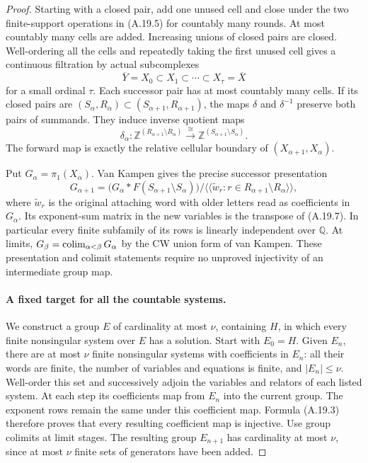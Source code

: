 \begin{proof}
Starting with a closed pair, add one unused cell and close
under the two finite-support operations in (A.19.5) for
countably many rounds. At most countably many cells are
added. Increasing unions of closed pairs are closed.
Well-ordering all the cells and repeatedly taking the first
unused cell gives a continuous filtration by actual
subcomplexes
\[
 \overline Y=X_0\subset X_1\subset\cdots\subset
 X_\tau=\overline X
 \tag{A.19.6}
\]
for a small ordinal $\tau$. Each successor pair has at most
countably many cells. If its closed pairs are
$(S_\alpha,R_\alpha)\subset(S_{\alpha+1},R_{\alpha+1})$,
the maps $\delta$ and $\delta^{-1}$ preserve both pairs of
summands. They induce inverse quotient maps
\[
 \delta_\alpha:
 \mathbb Z^{(R_{\alpha+1}\setminus R_\alpha)}
       \xrightarrow{\ \cong\ }
 \mathbb Z^{(S_{\alpha+1}\setminus S_\alpha)}.
 \tag{A.19.7}
\]
The forward map is exactly the relative cellular boundary of
$(X_{\alpha+1},X_\alpha)$.

Put $G_\alpha=\pi_1(X_\alpha)$. Van Kampen gives the precise
successor presentation
\[
 G_{\alpha+1}=
 \bigl(G_\alpha*F(S_{\alpha+1}\setminus S_\alpha)\bigr)
 \big/
 \langle\!\langle \widetilde w_r:
                    r\in R_{\alpha+1}\setminus R_\alpha
                    \rangle\!\rangle,
 \tag{A.19.8}
\]
where $\widetilde w_r$ is the original attaching word with
older letters read as coefficients in $G_\alpha$. Its
exponent-sum matrix in the new variables is the transpose
of (A.19.7). In particular every finite subfamily of its
rows is linearly independent over $\mathbb Q$. At limits,
$G_\beta=\mathop{\rm colim}_{\alpha<\beta}G_\alpha$ by
the CW union form of van Kampen. These presentation and
colimit statements require no unproved injectivity of an
intermediate group map.

\paragraph{A fixed target for all the countable systems.}
We construct a group $E$ of cardinality at most $\nu$,
containing $H$, in which every finite nonsingular system
over $E$ has a solution. Start with $E_0=H$. Given $E_n$,
there are at most $\nu$ finite nonsingular systems with
coefficients in $E_n$: all their words are finite, the
number of variables and equations is finite, and
$|E_n|\leq\nu$. Well-order this set and successively
adjoin the variables and relators of each listed system.
At each step its coefficients map from $E_n$ into the
current group. The exponent rows remain the same under
this coefficient map. Formula (A.19.3) therefore proves
that every resulting coefficient map is injective.
Use group colimits at limit stages. The resulting group
$E_{n+1}$ has cardinality at most $\nu$, since at most
$\nu$ finite sets of generators have been added.


\end{proof}
